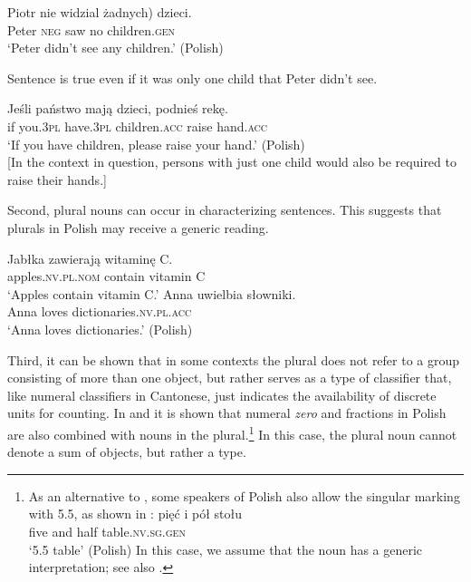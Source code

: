 \documentclass[output=paper,colorlinks,citecolor=brown]{langscibook}
\begin{document}
\ea\label{ex:geist:16}
\gll Piotr nie widzial \minsp{(} żadnych) dzieci. \\ 
Peter \textsc{neg} saw {} no children.\textsc{gen} \\ 
\glt `Peter didn't see any children.' \hfill (Polish)\\
\z

\noindent Sentence  is true even if it was only one child that Peter didn't see.

\ea\label{ex:geist:17}
\gll Jeśli państwo mają dzieci, podnieś rekę. \\ 
if you.\textsc{3pl} have.\textsc{3pl} children.\textsc{acc} raise hand.\textsc{acc} \\ 
\glt `If you have children, please raise your hand.' \hfill (Polish)\\
{[}In the context in question, persons with just one child would also be required to raise their hands.{]}
\z

\noindent Second, plural nouns can occur in characterizing sentences. This suggests that plurals in Polish may receive a generic reading.   

\ea\label{ex:geist:18}
\ea
\gll Jabłka zawierają witaminę C. \\
apples.\textsc{nv.pl.nom} contain vitamin C \\ 
\glt `Apples contain vitamin C.'\label{ex:geist:18a}
\ex 
\gll Anna uwielbia słowniki. \\
Anna loves dictionaries.\textsc{nv.pl.acc} \\
\glt `Anna loves dictionaries.'\label{ex:geist:18b}
\hfill (Polish)\z\z

\noindent Third, it can be shown that in some contexts the plural does not refer to a group consisting of more than one object, but rather serves as a type of classifier that, like numeral classifiers in Cantonese, just indicates the availability of discrete units for counting. In  and  it is shown that numeral \textit{zero} and fractions in Polish are also combined with nouns in the plural.\footnote{As an alternative to , some speakers of Polish also allow the singular marking with 5.5, as shown in :
\ea\gll pięć i pół stołu \\
five and half table.\textsc{nv.sg.gen} \\
\glt `5.5 table' \label{ex:geist:fn4}
\hfill (Polish) \z
In this case, we assume that the noun has a generic interpretation; see also \citet{KwapiszewskiFuellenbach2021}.} In this case, the plural noun cannot denote a sum of objects, but rather a type.
\end{document}
